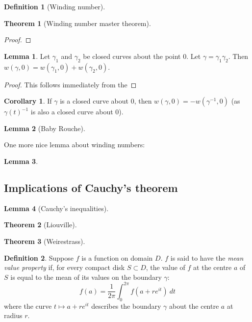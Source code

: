 \documentclass[aps,pra,showpacs,notitlepage,onecolumn,superscriptaddress,nofootinbib]{revtex4-1}
\theoremstyle{definition}
\newtheorem{definition}{Definition}[section]
\newtheorem{lemma}{Lemma}[section]
\newtheorem{theorem}{Theorem}[section]
\newtheorem{corollary}{Corollary}[theorem]
\begin{document}
\begin{definition}[Winding number]
  \end{definition}

\begin{theorem}[Winding number master theorem]
\end{theorem}

\begin{proof}
  \end{proof}

\begin{lemma}
  Let $\gamma_1$ and $\gamma_2$ be closed curves about the point $0$. Let $\gamma = \gamma_1 \gamma_2$. Then $w(\gamma, 0) = w(\gamma_1, 0) + w(\gamma_2, 0)$.
\end{lemma}

\begin{proof}
  This follows immediately from the 
  \end{proof}

\begin{corollary}
  If $\gamma$ is a closed curve about $0$, then $w(\gamma, 0) = -w(\gamma^{-1}, 0)$ (as $\gamma(t)^{-1}$ is also a closed curve about $0$).
\end{corollary}

\begin{lemma}[Baby Rouche]

\end{lemma}

\noindent One more nice lemma about winding numbers:

\begin{lemma}

  \end{lemma}

\subsection{Implications of Cauchy's theorem}

\begin{lemma}[Cauchy's inequalities]
  \end{lemma}

\begin{theorem}[Liouville]
\end{theorem}

\begin{theorem}[Weirestrass]
\end{theorem}

\begin{definition}
  Suppose $f$ is a function on domain $D$. $f$ is said to have the \emph{mean value property} if, for every compact disk $S \subset D$, the value
  of $f$ at the centre $a$ of $S$ is equal to the mean of its values on the boundary $\gamma$:
  \begin{equation}
    f(a) = \frac{1}{2\pi} \displaystyle\int_{0}^{2\pi} f(a + re^{it}) \ dt
  \end{equation}
  where the curve $t \mapsto a + re^{it}$ describes the boundary $\gamma$ about the centre $a$ at radius $r$.
  \end{definition}
\end{document}
